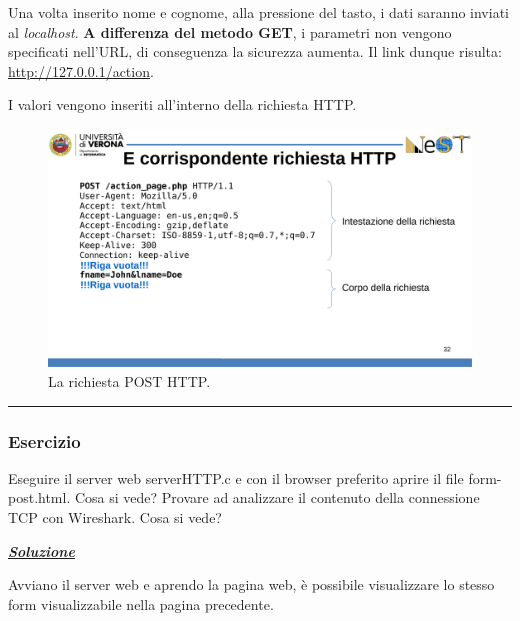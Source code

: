 \documentclass[a4paper]{article}
\newcommand{\longline}{\noindent\rule{\textwidth}{0.4pt}}
\begin{document}
	\noindent
	Una volta inserito nome e cognome, alla pressione del tasto, i dati saranno inviati al \emph{localhost}. \textbf{A differenza del metodo GET}, i parametri non vengono specificati nell'URL, di conseguenza la sicurezza aumenta. Il link dunque risulta: \url{http://127.0.0.1/action}.\newline
	
	\noindent
	I valori vengono inseriti all'interno della richiesta HTTP.\newpage
	
	\begin{figure}[!htp]
		\centering
		\includegraphics[width=\textwidth]{img/richiesta_post.pdf}
		\caption{La richiesta POST HTTP.}
	\end{figure}
	
	\longline
	
	\subsubsection[\textcolor{Red3}{\textbf{Esercizio}}]{Esercizio}
	
	Eseguire il server web \textsf{serverHTTP.c} e con il browser preferito aprire il file \textsf{form-post.html}. Cosa si vede? Provare ad analizzare il contenuto della connessione TCP con Wireshark. Cosa si vede?\newline
	
	\noindent
	\textcolor{Green4}{\underline{\textbf{\emph{Soluzione}}}}\newline
	
	\noindent
	Avviano il server web e aprendo la pagina web, è possibile visualizzare lo stesso form visualizzabile nella pagina precedente.\newline
	
\end{document}
